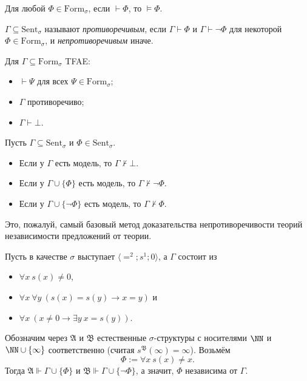 \documentclass[12pt,a4paper]{article}
\newcommand{\Formul}{\ensuremath{\mathrm{Form}}\xspace}
\newcommand{\Sent}{\ensuremath{\mathrm{Sent}}\xspace}
\begin{document}
    \begin{corollary}
        Для любой $\Phi \in \Formul_\sigma$, если $\vdash \Phi$, то $\vDash \Phi$.
    \end{corollary}

    \begin{definition}
        $\Gamma \subseteq \Sent_\sigma$ называют \emph{противоречивым}, если $\Gamma \vdash \Phi$ и $\Gamma \vdash \neg \Phi$ для некоторой $\Phi \in \Formul_\sigma$, и \emph{непротиворечивым} иначе.
    \end{definition}

    \begin{lemma}
        Для $\Gamma \subseteq \Formul_\sigma$ TFAE:
        \begin{itemize}
            \item $\vdash \Psi$ для всех $\Psi \in \Formul_\sigma$;
            \item $\Gamma$ противоречиво;
            \item $\Gamma \vdash \bot$.
        \end{itemize}
    \end{lemma}

    \begin{corollary}
        Пусть $\Gamma \subseteq \Sent_\sigma$ и $\Phi \in \Sent_\sigma$.
        \begin{itemize}
            \item Если у $\Gamma$ есть модель, то $\Gamma \nvdash \bot$.
            \item Если у $\Gamma \cup \{\Phi\}$ есть модель, то $\Gamma \nvdash \neg \Phi$.
            \item Если у $\Gamma \cup \{ \neg \Phi\}$ есть модель, то $\Gamma \nvdash \Phi$.
        \end{itemize}
    \end{corollary}

    \begin{remark*}
        Это, пожалуй, самый базовый метод доказательства непротиворечивости теорий независимости предложений от теории.
    \end{remark*}

    \begin{example}
        Пусть в качестве $\sigma$ выступает $\langle =^2; s^1; 0 \rangle$, а $\Gamma$ состоит из
        \begin{itemize}
            \item $\forall x\ s(x) \neq 0$,
            \item $\forall x\ \forall y\ (s(x) = s(y) \rightarrow x = y)$ и
            \item $\forall x\ (x \neq 0 \rightarrow \exists y\ x = s(y))$.
        \end{itemize}
        Обозначим через $\mathfrak{A}$ и $\mathfrak{B}$ естественные $\sigma$-структуры с носителями $\NN$ и $\NN \cup \{\infty\}$ соответственно (считая $s^\mathfrak{B}(\infty) = \infty$). Возьмём
        \[
            \Phi := \forall x\ s(x) \neq x.
        \]
        Тогда $\mathfrak{A} \Vdash \Gamma \cup \{\Phi\}$ и $\mathfrak{B} \Vdash \Gamma \cup \{\neg \Phi\}$, а значит, $\Phi$ независима от $\Gamma$.
    \end{example}
\end{document}
